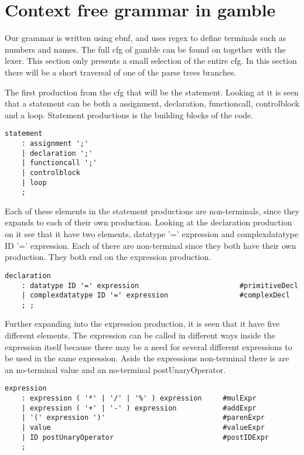 \section{Context free grammar in gamble}
Our grammar is written using \acrfull{ebnf}, and uses \acrfull{regex} to define terminals such as numbers and names.
The full \acrshort{cfg} of \gls{gamble} can be found on  together with the lexer. This section only presents a small selection of the entire \acrshort{cfg}.
In this section there will be a short traversal of one of the parse trees branches.

The first production from the \acrshort{cfg} that will be the statement. 
Looking at  it is seen that a statement can be both a assignment, declaration, functioncall, controlblock and a loop. 
Statement productions is the building blocks of the code.

\begin{lstlisting}[caption={\acrshort{cfg} Statement},frame=tlrb,label={lst:statements},numbers=none]
statement
    : assignment ';'
    | declaration ';'
    | functioncall ';'
    | controlblock
    | loop
    ;
\end{lstlisting}

Each of these elements in the statement productions are non-terminals, since they expands to each of their own production.
Looking at the declaration production on  it see that it have two elements, datatype '=' expression and complexdatatype ID '=' expression.
Each of there are non-terminal since they both have their own production. They both end on the expression production.

\begin{lstlisting}[caption={\acrshort{cfg} Declaration},frame=tlrb,label={lst:declaration},numbers=none]
declaration
    : datatype ID '=' expression                        #primitiveDecl
    | complexdatatype ID '=' expression                 #complexDecl
    ; ;
\end{lstlisting}

Further expanding into the expression production, it is seen that it have five different elements.
The expression can be called in different ways inside the expression itself because there may be a need for several different expressions to be used in the same expression.
Aside the expressions non-terminal there is are an no-terminal value and an no-terminal postUnaryOperator.
\begin{lstlisting}[caption={\acrshort{cfg} Expression},frame=tlrb,label={lst:expression},numbers=none]
expression
    : expression ( '*' | '/' | '%' ) expression     #mulExpr
    | expression ( '+' | '-' ) expression           #addExpr
    | '(' expression ')'                            #parenExpr
    | value                                         #valueExpr
    | ID postUnaryOperator                          #postIDExpr
    ;
\end{lstlisting}
  
